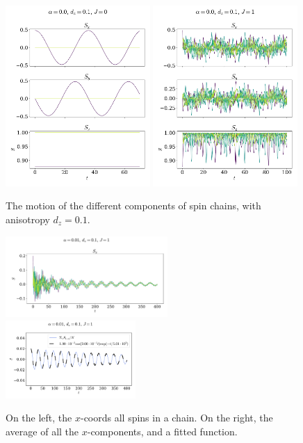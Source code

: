\documentclass{article}
\begin{document}
    \begin{figure}[H]
        \centering
        \includegraphics[width=0.49\textwidth]{../plots/2221b.pdf}
        \includegraphics[width=0.49\textwidth]{../plots/2222.pdf}
        \caption{The motion of the different components of spin chains, with anisotropy $d_z=0.1$.}
        \label{one tilted}
    \end{figure}

    \begin{figure}[H]
        \centering
        \includegraphics[width=0.55\textwidth]{../plots/2224.pdf}
        \includegraphics[width=0.44\textwidth]{../plots/2224fit.pdf}
        \caption{On the left, the $x$-coords all spins in a chain. On the right, the average of all the $x$-components, and a fitted function.}
        \label{one tilted dampend}
    \end{figure}
\end{document}
